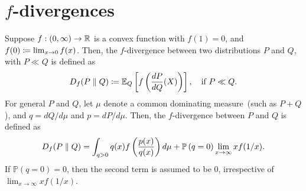             
    \section{$f$-divergences}
        \begin{definition}
            \label{def:f-divergence} Suppose $f:(0, \infty) \to \mathbb{R}$ is a convex function with $f(1)=0$, and $f(0) \coloneqq \lim_{x\to 0} f(x)$. Then, the $f$-divergence between two distributions $P$ and $Q$, with $P\ll Q$ is defined as 
            \begin{align}
                D_f(P\parallel Q) \coloneqq 
                    \mathbb{E}_{Q} \left[ f\left( \frac{dP}{dQ}(X) \right) \right], \quad \text{if } P \ll Q. 
            \end{align}
            For general $P$ and $Q$, let $\mu$ denote a common dominating measure~(such as $P+Q$), and $q = dQ/d\mu$ and $p = dP/d\mu$. Then, the $f$-divergence between $P$ and $Q$ is defined as 
            \begin{align}
                D_f(P \parallel Q) = \int_{q>0} q(x) f\left( \frac{p(x)}{q(x)} \right) d\mu + \mathbb{P}\left( q=0\right) \lim_{x \to \infty} x f(1/x).
            \end{align}
            If $\mathbb{P}(q=0)=0$, then the second term is assumed to be $0$, irrespective of $\lim_{x \to \infty}xf(1/x)$. 
        \end{definition}

